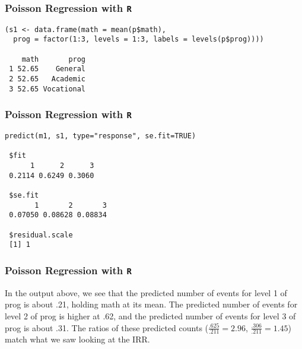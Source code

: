 \documentclass[00-GLMregslides.tex]{subfiles}
\begin{document}
\begin{frame}[fragile]

\frametitle{Poisson Regression with \texttt{R}}
\Large

\begin{framed}
\begin{verbatim}
(s1 <- data.frame(math = mean(p$math),
  prog = factor(1:3, levels = 1:3, labels = levels(p$prog))))
 
    math       prog
 1 52.65    General
 2 52.65   Academic
 3 52.65 Vocational
\end{verbatim}
\end{framed}
\end{frame}

\begin{frame}[fragile]

\frametitle{Poisson Regression with \texttt{R}}
\Large 

\begin{framed}
\begin{verbatim}
predict(m1, s1, type="response", se.fit=TRUE)
 
 $fit
      1      2      3 
 0.2114 0.6249 0.3060 
 
 $se.fit
       1       2       3 
 0.07050 0.08628 0.08834 
 
 $residual.scale
 [1] 1
\end{verbatim}
\end{framed}
\end{frame}

\begin{frame}[fragile]

\frametitle{Poisson Regression with \texttt{R}}
\Large 
In the output above, we see that the predicted number of events for level 1 of prog is about .21, holding math at its mean. The predicted number of events for level 2 of prog is higher at .62, and the predicted number of events for level 3 of prog is about .31. The ratios of these predicted counts (\(\frac{.625}{.211} = 2.96\), \(\frac{.306}{.211} = 1.45\)) match what we saw looking at the IRR.

\end{frame}
\end{document}
